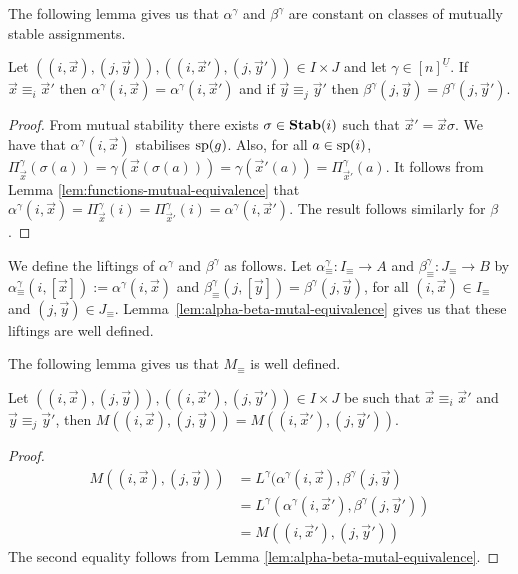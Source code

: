 \documentclass[../main/thesis.tex]{subfiles}
\begin{document}
The following lemma gives us that $\alpha^{\gamma}$ and $\beta^{\gamma}$ are
constant on classes of mutually stable assignments.

\begin{lem}
	Let $((i, \vec{x}), (j, \vec{y})), ((i, \vec{x}'), (j, \vec{y}')) \in I \times
  J$ and let $\gamma \in [n]^{\underline{U}}$. If $\vec{x} \equiv_i \vec{x}'$
  then $\alpha^{\gamma}(i, \vec{x}) = \alpha^{\gamma}(i, \vec{x}')$ and if
  $\vec{y} \equiv_j \vec{y}'$ then $\beta^{\gamma}(j, \vec{y}) =
  \beta^{\gamma}(j, \vec{y}')$.
	\label{lem:alpha-beta-mutal-equivalence}
\end{lem}
\begin{proof}
	From mutual stability there exists $\sigma \in \text{\textbf{Stab}}(i)$ such that $\vec{x}' =
  \vec{x} \sigma$. We have that $\alpha^{\gamma}(i, \vec{x})$ stabilises
  $\text{sp}(g)$. Also, for all $a \in \text{sp}(i)$, $\Pi^{\gamma}_{\vec{x}} (\sigma
  (a)) = \gamma (\vec{x}(\sigma (a))) = \gamma (\vec{x}'(a)) =
  \Pi^{\gamma}_{\vec{x}'}(a)$. It follows from Lemma
  \ref{lem:functions-mutual-equivalence} that $\alpha^{\gamma}(i,\vec{x}) =
  \Pi^{\gamma}_{\vec{x}} (i) = \Pi^{\gamma}_{\vec{x}'}(i) = \alpha^{\gamma}(i,
  \vec{x}')$. The result follows similarly for $\beta$.
\end{proof}

We define the liftings of $\alpha^{\gamma}$ and $\beta^{\gamma}$ as follows. Let
$\alpha^{\gamma}_{\equiv} : I_\equiv \rightarrow A$ and $\beta^{\gamma}_\equiv:
J_\equiv \rightarrow B$ by $\alpha^{\gamma}_{\equiv}(i, [\vec{x}]) :=
\alpha^{\gamma} (i, \vec{x})$ and $\beta^{\gamma}_{\equiv}(j, [\vec{y}]) =
\beta^{\gamma} (j, \vec{y})$, for all $(i, \vec{x}) \in I_{\equiv}$ and $(j,
\vec{y}) \in J_\equiv$. Lemma~\ref{lem:alpha-beta-mutal-equivalence} gives us
that these liftings are well defined.

The following lemma gives us that $M_\equiv$ is well defined.

\begin{lem}
	Let $((i, \vec{x}), (j, \vec{y})), ((i, \vec{x}'), (j, \vec{y}')) \in I \times
  J$ be such that $\vec{x} \equiv_i \vec{x}'$ and $\vec{y} \equiv_j \vec{y}'$,
  then $M((i, \vec{x}), (j, \vec{y})) = M((i, \vec{x}'), (j, \vec{y}'))$.
	\label{lem:matrix-quot-well-defined}
\end{lem}
\begin{proof}
	\begin{align*}
		M((i, \vec{x}),(j, \vec{y})) & = L^{\gamma}(\alpha^{\gamma}(i, \vec{x}), \beta^{\gamma}(j, \vec{y})    \\
		                             & = L^{\gamma}(\alpha^{\gamma}(i, \vec{x}'), \beta^{\gamma}(j, \vec{y}')) \\
		                             & = M((i, \vec{x}'), (j, \vec{y}'))                                       
	\end{align*}
	The second equality follows from Lemma \ref{lem:alpha-beta-mutal-equivalence}.
\end{proof}
\end{document}
